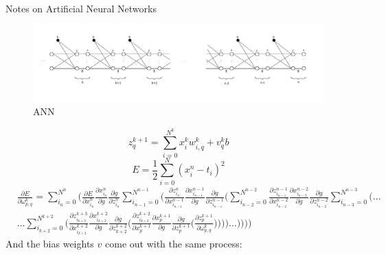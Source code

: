 \documentclass{amsart}
\begin{document}
%
\begin{center}
Notes on Artificial Neural Networks
\end{center}
%
\begin{figure}[h!]
\label{colliding_spheres}
\centering
  \includegraphics[angle=0,width=140mm]{ANN.jpg}
\caption{ANN}
\end{figure}
%
\begin{equation*}
z_q^{k+1} = \sum_{i=0}^{N^k} x_i^k w_{i,q}^k + v_q^k b
\end{equation*}
%
\begin{equation*}
E = \frac{1}{2} \sum_{i=0}^N (x_i^n - t_i)^2
\end{equation*}
%
\begin{equation*}
\begin{aligned}
&\frac{\partial E}{\partial \omega_{p,q}^k} = \sum_{i_n = 0}^{N^n} \Bigg( \frac{\partial E}{\partial x_{i_n}^n}
\frac{\partial x_{i_n}^n}{\partial g} \frac{\partial g}{\partial z_{i_n}^n} \sum_{i_{n-1}=0}^{N^{n-1}} \Bigg(
\frac{\partial z_{i_n}^n}{\partial x_{i_{n-1}}^{n-1}} \frac{\partial x_{i_{n-1}}^{n-1}}{\partial g}
\frac{\partial g}{\partial z_{i_{n-1}}^{n-1}} \Bigg( \sum_{i_{n-2}=0}^{N^{n-2}}
\frac{\partial z_{i_{n-1}}^{n-1}}{\partial x_{i_{n-2}}^{n-2}}
\frac{\partial x_{i_{n-2}}^{n-2}}{\partial g} \frac{\partial g}{\partial z_{i_{n-2}}^{n-2}}
\sum_{i_{n-3}=0}^{N^{n-3}} \Bigg( \ldots\\
&\ldots \sum_{i_{k+2}=0}^{N^{k+2}} \Bigg( \frac{\partial z_{i_{k+3}}^{k+3}}{\partial x_{i_{k+2}}^{k+2}}
\frac{\partial x_{i_{k+2}}^{k+2}}{\partial g}
\frac{\partial g}{\partial z_{k+2}^{k+2}} \Bigg( \frac{\partial z_{i_{k+2}}^{k+2}}{\partial x_p^{k+1}}
\frac{\partial x_p^{k+1}}{\partial g}
\frac{\partial g}{\partial z_p^{k+1}} \Bigg(
\frac{\partial z_p^{k+1}}{\partial \omega_{p,q}^k} \Bigg)\Bigg)\Bigg)\Bigg) \ldots \Bigg)\Bigg)\Bigg)\Bigg)
\end{aligned}
\end{equation*}
%
And the bias weights $v$ come out with the same process:
%
\end{document}
